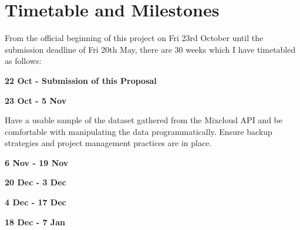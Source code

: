

\section{Timetable and Milestones}

From the official beginning of this project on Fri 23rd October until the submission deadline of Fri 20th May, there are 30 weeks which I have timetabled as follows:

\textbf{22 Oct - Submission of this Proposal}

\textbf{23 Oct - 5 Nov}

Have a usable sample of the dataset gathered from the Mixcloud API and be comfortable with manipulating the data programmatically.
Ensure backup strategies and project management practices are in place.

\textbf{6 Nov - 19 Nov}


\textbf{20 Dec - 3 Dec}


\textbf{4 Dec - 17 Dec}


\textbf{18 Dec - 7 Jan}

